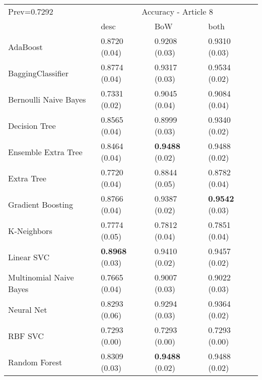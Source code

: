 \begin{tabular}{|l|l|l|l| }
\hline
Prev=0.7292 &  \multicolumn{3}{c|}{Accuracy - Article 8} \\
\cline{2-4} & desc & BoW & both \\ \hline
AdaBoost                & 0.8720 (0.04) & 0.9208 (0.03) & 0.9310 (0.03)\\
BaggingClassifier       & 0.8774 (0.04) & 0.9317 (0.03) & 0.9534 (0.02)\\
Bernoulli Naive Bayes   & 0.7331 (0.02) & 0.9045 (0.04) & 0.9084 (0.04)\\
Decision Tree           & 0.8565 (0.04) & 0.8999 (0.03) & 0.9340 (0.02)\\
Ensemble Extra Tree     & 0.8464 (0.04) & {\bf 0.9488} (0.02) & 0.9488 (0.02)\\
Extra Tree              & 0.7720 (0.04) & 0.8844 (0.05) & 0.8782 (0.04)\\
Gradient Boosting       & 0.8766 (0.04) & 0.9387 (0.02) & {\bf 0.9542} (0.03)\\
K-Neighbors             & 0.7774 (0.05) & 0.7812 (0.04) & 0.7851 (0.04)\\
Linear SVC              & {\bf 0.8968} (0.03) & 0.9410 (0.02) & 0.9457 (0.02)\\
Multinomial Naive Bayes & 0.7665 (0.04) & 0.9007 (0.03) & 0.9022 (0.03)\\
Neural Net              & 0.8293 (0.06) & 0.9294 (0.03) & 0.9364 (0.02)\\
RBF SVC                 & 0.7293 (0.00) & 0.7293 (0.00) & 0.7293 (0.00)\\
Random Forest           & 0.8309 (0.03) & {\bf 0.9488} (0.02) & 0.9488 (0.02)\\
\hline
\end{tabular}
